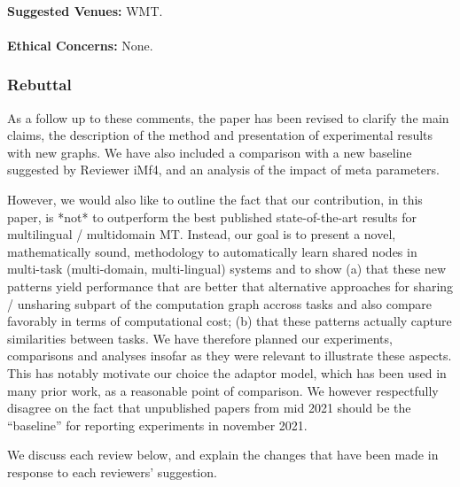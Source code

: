 \documentclass[12pt,times,a4paper,twoside]{article}
\theoremstyle{definition}
\begin{document}
\paragraph{}\textbf{Suggested Venues:} WMT.
\paragraph{}\textbf{Ethical Concerns:} None.

\subsubsection*{Rebuttal}
{
  \color{blue}
  
As a follow up to these comments, the paper has been revised to clarify the main claims, the description of the method and presentation of experimental results with new graphs. We have also included a comparison with a new baseline suggested by Reviewer iMf4, and an analysis of the impact of meta parameters.

However, we would also like to outline the fact that our contribution, in this paper, is *not* to outperform the best published state-of-the-art results for multilingual / multidomain MT. Instead, our goal is to present a novel, mathematically sound, methodology to automatically learn shared nodes in multi-task (multi-domain, multi-lingual) systems and to show (a) that these new patterns yield performance that are better that alternative approaches for sharing / unsharing subpart of the computation graph accross tasks and also compare favorably in terms of computational cost; (b) that these patterns actually capture similarities between tasks. We have therefore planned our experiments, comparisons and analyses insofar as they were relevant to illustrate these aspects. This has notably motivate our choice the adaptor model, which has been used in many prior work, as a reasonable point of comparison. We however respectfully disagree on the fact that unpublished papers from mid 2021 should be the ``baseline'' for reporting experiments in november 2021.

We discuss each review below, and explain the changes that have been made in response to each reviewers' suggestion.
}

\end{document}
